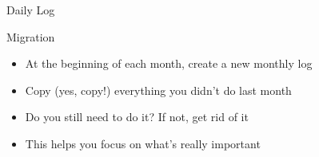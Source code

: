 \documentclass[aspectratio=169]{beamer}
\begin{document}
    {
    \begin{frame}{Daily Log}
    \end{frame}
    }

    {
    \begin{frame}{Migration}
        \begin{itemize}
            \item At the beginning of each month, create a new monthly log
            \item Copy (yes, \alert{copy}!) everything you didn't do last month
            \item Do you still need to do it? If not, get rid of it
            \pause
            \item This helps you focus on what's \alert{really} important
        \end{itemize}
    \end{frame}
    }
\end{document}
